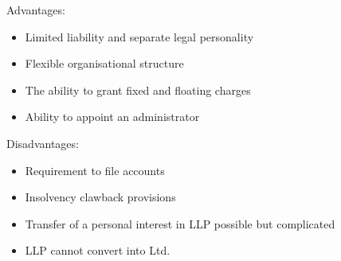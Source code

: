 \documentclass[
]{article}
\providecommand{\tightlist}{%
  \setlength{\itemsep}{0pt}\setlength{\parskip}{0pt}}
\begin{document}
Advantages:

\begin{itemize}
\tightlist
\item
  Limited liability and separate legal personality
\item
  Flexible organisational structure
\item
  The ability to grant fixed and floating charges
\item
  Ability to appoint an administrator
\end{itemize}

Disadvantages:

\begin{itemize}
\tightlist
\item
  Requirement to file accounts
\item
  Insolvency clawback provisions
\item
  Transfer of a personal interest in LLP possible but complicated
\item
  LLP cannot convert into Ltd.
\end{itemize}
\end{document}
